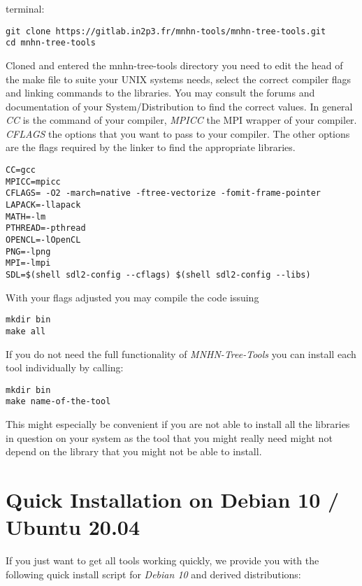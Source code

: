 terminal:
\begin{lstlisting}                                                              
git clone https://gitlab.in2p3.fr/mnhn-tools/mnhn-tree-tools.git
cd mnhn-tree-tools
\end{lstlisting}
Cloned and entered the mnhn-tree-tools
directory you need to edit the head of the
make file to suite your UNIX systems needs, select the correct compiler
flags and linking commands to the libraries. You may consult the
forums and documentation of your System/Distribution to find the
correct values. In general \emph{CC} is the command of your compiler,
\emph{MPICC} the MPI wrapper of your compiler. \emph{CFLAGS} the
options that you want to pass to your compiler. The other options are
the flags required by the linker to find the appropriate libraries.
\begin{lstlisting}                                                           
CC=gcc
MPICC=mpicc
CFLAGS= -O2 -march=native -ftree-vectorize -fomit-frame-pointer 
LAPACK=-llapack
MATH=-lm
PTHREAD=-pthread
OPENCL=-lOpenCL
PNG=-lpng
MPI=-lmpi
SDL=$(shell sdl2-config --cflags) $(shell sdl2-config --libs)
\end{lstlisting}
With your flags adjusted you may compile the code issuing
\begin{lstlisting}
mkdir bin
make all
\end{lstlisting}
If you do not need the full functionality of \emph{MNHN-Tree-Tools} you can
install each tool individually by calling:
\begin{lstlisting}
mkdir bin
make name-of-the-tool
\end{lstlisting}
This might especially be convenient if you are not able to install all
the libraries in question on your system as the tool that you might
really need might not depend on the library that you might not be able
to install.

\section{Quick Installation on Debian 10 / Ubuntu 20.04}
If you just want to get all tools working quickly, we provide you with the
following quick install script for \emph{Debian 10} and derived distributions:

